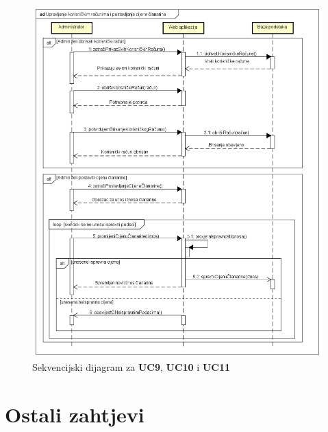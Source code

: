 	\begin{figure}[H]
		\includegraphics[width=\textwidth]{dijagrami/sd4.PNG}
		\centering
		\vspace{-1cm}
		\caption{Sekvencijski dijagram za \textbf{UC9}, \textbf{UC10} i \textbf{UC11}}
		\label{fig:promjene}
	\end{figure}
	
	\vspace{-0.6cm}
	
	\newpage
	
	\section{Ostali zahtjevi}
	
